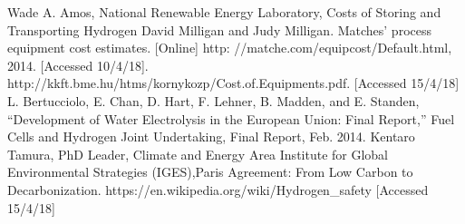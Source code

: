 \documentclass[11pt, a4paper]{article}
\begin{document}
\begin{thebibliography}{99}



















Wade A. Amos, National Renewable Energy Laboratory, Costs of Storing and Transporting Hydrogen
David Milligan and Judy Milligan. Matches’ process equipment cost estimates. [Online] http: //matche.com/equipcost/Default.html, 2014. [Accessed 10/4/18].
http://kkft.bme.hu/htms/kornykozp/Cost.of.Equipments.pdf. [Accessed 15/4/18]
L. Bertucciolo, E. Chan, D. Hart, F. Lehner, B. Madden, and E. Standen, “Development of Water Electrolysis in the European Union: Final Report,” Fuel Cells and Hydrogen Joint Undertaking, Final Report, Feb. 2014.
Kentaro Tamura, PhD Leader, Climate and Energy Area
Institute for Global Environmental Strategies (IGES),Paris Agreement: From Low Carbon to Decarbonization.
https://en.wikipedia.org/wiki/Hydrogen\_safety [Accessed 15/4/18]



\end{thebibliography}
\end{document}

